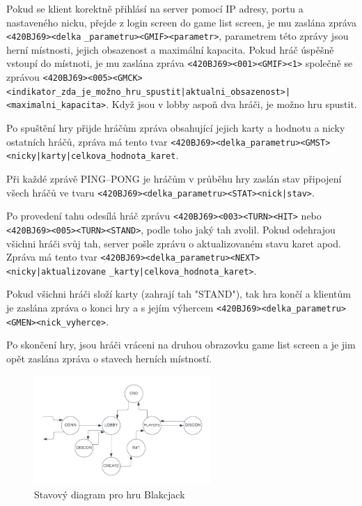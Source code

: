 \documentclass{article}
\begin{document}
Pokud se klient korektně přihlásí na server pomocí IP adresy, portu a nastaveného nicku, přejde z login screen do game list screen, je mu zaslána zpráva \texttt{<420BJ69><delka} \texttt{\_parametru><GMIF><parametr>}, parametrem této zprávy jsou herní místnosti, jejich obsazenost a maximální kapacita. Pokud hráč úspěšně vstoupí do místnoti, je mu zaslána zpráva \texttt{<420BJ69><001><GMIF><1>} společně se zprávou \texttt{<420BJ69><005><GMCK><indikator\_zda\_je\_možno\_hru\_spustit|aktualni\_obsazenost>|} \\ \texttt{<maximalni\_kapacita>}. Když jsou v lobby aspoň dva hráči, je možno hru spustit.

Po spuštění hry přijde hráčům zpráva obsahující jejich karty a hodnotu a nicky ostatních hráčů, zpráva má tento tvar \texttt{<420BJ69><delka\_parametru><GMST><nicky|karty|celkova\_hodnota\_karet}.

Při každé zprávě PING--PONG je hráčům v průběhu hry zaslán stav připojení všech hráčů ve tvaru \texttt{<420BJ69><delka\_parametru><STAT><nick|stav>}.

Po provedení tahu odesílá hráč zprávu \texttt{<420BJ69><003><TURN><HIT>} nebo \texttt{<420BJ69><005><TURN><STAND>}, podle toho jaký tah zvolil. Pokud odehrajou všichni hráči svůj tah, server pošle zprávu o aktualizovaném stavu karet apod. Zpráva má tento tvar \texttt{<420BJ69><delka\_parametru><NEXT><nicky|aktualizovane}
\texttt{\_karty|celkova\_hodnota\_karet>}.

Pokud všichni hráči složí karty (zahrají tah "STAND"), tak hra končí a klientům je zaslána zpráva o konci hry a s jejím výhercem \texttt{<420BJ69><delka\_parametru><GMEN><nick\_vyherce>}.

Po skončení hry, jsou hráči vráceni na druhou obrazovku game list screen a je jim opět zaslána zpráva o stavech herních místností.

\begin{figure}[h] %
    \centering %
    \includegraphics[width=0.6\textwidth]{img/diagram.png} %
    \caption{Stavový diagram pro hru Blakcjack} %
    \label{fig:obrazek} %
\end{figure}
\end{document}
